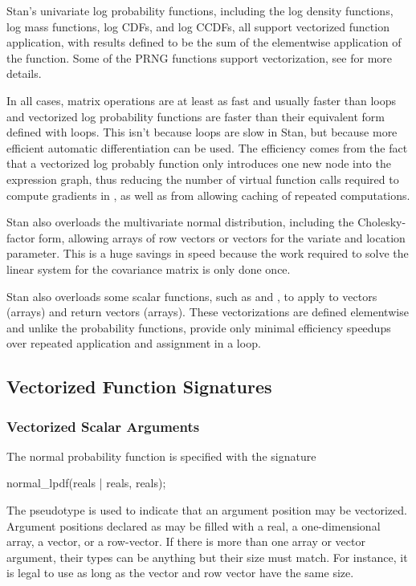 \noindent
Stan's univariate log probability functions, including the log density
functions, log mass functions, log CDFs, and log CCDFs, all support
vectorized function application, with results defined to be the sum of
the elementwise application of the function.  Some of the PRNG
functions support vectorization, see
 for more details.

In all cases, matrix operations are at least as fast and usually
faster than loops and vectorized log probability functions are faster
than their equivalent form defined with loops.  This isn't because
loops are slow in Stan, but because more efficient automatic
differentiation can be used.  The efficiency comes from the fact that
a vectorized log probably function only introduces one new node into
the expression graph, thus reducing the number of virtual function
calls required to compute gradients in \Cpp, as well as from allowing
caching of repeated computations.

Stan also overloads the multivariate normal distribution, including
the Cholesky-factor form, allowing arrays of row vectors or vectors
for the variate and location parameter.  This is a huge savings in
speed because the work required to solve the linear system for the
covariance matrix is only done once.

Stan also overloads some scalar functions, such as  and
, to apply to vectors (arrays) and return vectors (arrays).
These vectorizations are defined elementwise and unlike the
probability functions, provide only minimal efficiency speedups over
repeated application and assignment in a loop.


\subsection{Vectorized Function Signatures}\label{prob-vectorization.section}

\subsubsection{Vectorized Scalar Arguments}

The normal probability function is specified with the signature
%
\begin{stancode}
normal_lpdf(reals | reals, reals);
\end{stancode}
%
The pseudotype  is used to indicate that an argument
position may be vectorized.  Argument positions declared as
 may be filled with a real, a one-dimensional array, a
vector, or a row-vector.  If there is more than one array or vector
argument, their types can be anything but their size must match.  For
instance, it is legal to use
 as long as the vector and
row vector have the same size.


